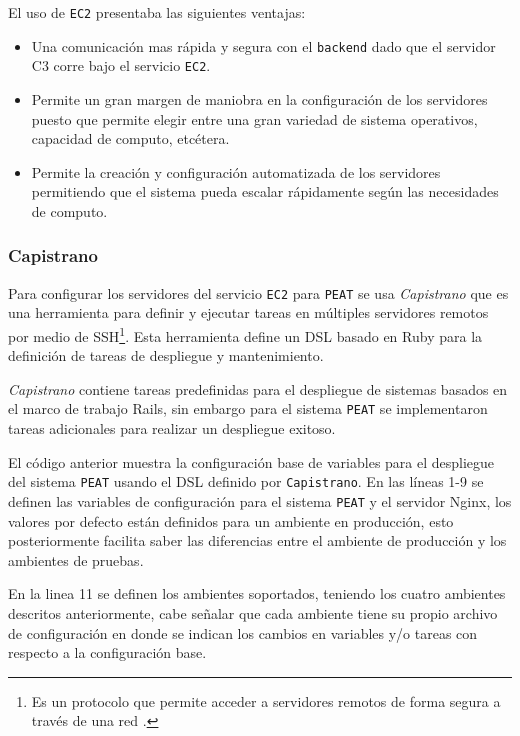 El uso de \texttt{EC2} presentaba las siguientes ventajas:
\begin{itemize}
\item Una comunicación mas rápida y segura con el \texttt{backend} dado que el
  servidor C3 corre bajo el servicio \texttt{EC2}.
\item Permite un gran margen de maniobra en la configuración de los servidores
  puesto que permite elegir entre una gran variedad de sistema operativos,
  capacidad de computo, etcétera.
\item Permite la creación y configuración automatizada de los servidores
  permitiendo que el sistema pueda escalar rápidamente según las necesidades
  de computo.
\end{itemize}

\subsubsection{Capistrano}

Para configurar los servidores del servicio \texttt{EC2} para \texttt{PEAT} se usa
\textit{Capistrano} que es una herramienta para definir y ejecutar tareas en
múltiples servidores remotos por medio de SSH\footnote{Es un protocolo que permite
  acceder a servidores remotos de forma segura a través de una red
  \cite{29_ssh_protocol}.}. Esta herramienta define un DSL basado en Ruby para la
definición de tareas de despliegue y mantenimiento.

\textit{Capistrano} contiene tareas predefinidas para el despliegue de sistemas
basados en el marco de trabajo Rails, sin embargo para el sistema \texttt{PEAT} se
implementaron tareas adicionales para realizar un despliegue exitoso.



El código anterior muestra la configuración base de variables para el
despliegue del sistema \texttt{PEAT} usando el DSL definido por \texttt{Capistrano}.
En las líneas 1-9 se definen las variables de configuración para el sistema
\texttt{PEAT} y el servidor Nginx, los valores por defecto están definidos
para un ambiente en producción, esto posteriormente facilita saber las diferencias
entre el ambiente de producción y los ambientes de pruebas.

En la linea 11 se definen los ambientes soportados, teniendo los cuatro
ambientes descritos anteriormente, cabe señalar que cada ambiente tiene
su propio archivo de configuración en donde se indican los cambios en variables
y/o tareas con respecto a la configuración base.

